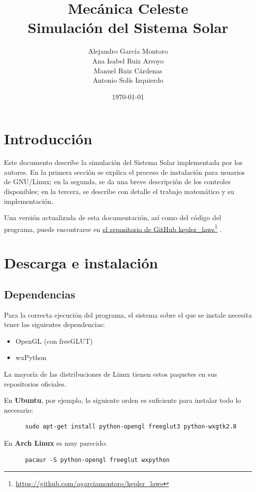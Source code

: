 \documentclass[a4paper, 11pt]{article}
\title{Mecánica Celeste \\ Simulación del Sistema Solar}
\author{Alejandro García Montoro\\
        Ana Isabel Ruiz Arroyo\\
        Manuel Ruiz Cárdenas\\
        Antonio Solís Izquierdo}
\date{\today}
\newcommand\fnurl[2]{%
  \href{#2}{#1}\footnote{\url{#2}}%
}
\begin{document}
  \maketitle

  \section{Introducción}
  Este documento describe la simulación del Sistema Solar implementada por los autores. En la primera sección se explica el proceso de instalación para usuarios de GNU/Linux; en la segunda, se da una breve descripción de los controles disponibles; en la tercera, se describe con detalle el trabajo matemático y su implementación.

  Una versión actualizada de esta documentación, así como del código del programa, puede encontrarse en \fnurl{el repositorio de GitHub kepler\_laws}{https://github.com/agarciamontoro/kepler_laws}.

  \section{Descarga e instalación}
  \subsection{Dependencias}
  Para la correcta ejecución del programa, el sistema sobre el que se instale necesita tener las siguientes dependencias:

  \begin{itemize}
      \item OpenGL (con freeGLUT)
      \item wxPython
  \end{itemize}

  La mayoría de las distribuciones de Linux tienen estos paquetes en sus repositorios oficiales.

  En \textbf{Ubuntu}, por ejemplo, la siguiente orden es suficiente para instalar todo lo necesario:

  \begin{lstlisting}
      sudo apt-get install python-opengl freeglut3 python-wxgtk2.8
  \end{lstlisting}

  En \textbf{Arch Linux} es muy parecido:

  \begin{lstlisting}
      pacaur -S python-opengl freeglut wxpython
  \end{lstlisting}
\end{document}
